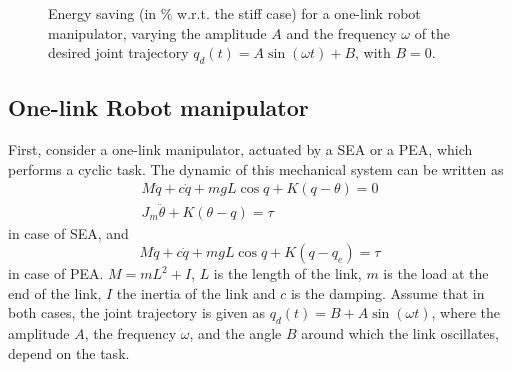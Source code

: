 \begin{figure}[t]
\caption{Energy saving (in $\%$ w.r.t. the stiff case) for a one-link robot manipulator, varying the amplitude $A$ and the frequency $\omega$ of the desired joint trajectory $q_d(t)=A\sin(\omega t)+B$, with $B=0$.}
\label{fig:EnergySaving}
\end{figure}

\subsection{One-link Robot manipulator}

First, consider a one-link manipulator, actuated by a SEA or a PEA, which performs a cyclic task. The dynamic of this mechanical system can be written as
\begin{equation}
\begin{aligned}
M\ddot{q} + c\dot{q} + mgL\cos q + K(q-\theta)=0\\
J_{m}\ddot{\theta} + K(\theta-q)=\tau
\end{aligned}
\label{eq:onelinkSEA}
\end{equation}
in case of SEA, and
\begin{equation}
M\ddot{q} + c\dot{q} + mgL\cos q + K(q-q_e)=\tau
\label{eq:onelinkPEA}
\end{equation}
in case of PEA. $M=mL^2+I$, $L$ is the length of the link, $m$ is the load at the end of the link, $I$ the inertia of the link and $c$ is the damping.
Assume that in both cases, the joint trajectory is given as $q_d(t)=B+A\sin(\omega t)$, where the amplitude $A$, the frequency $\omega$, and the angle $B$ around which the link oscillates, depend on the task. 

